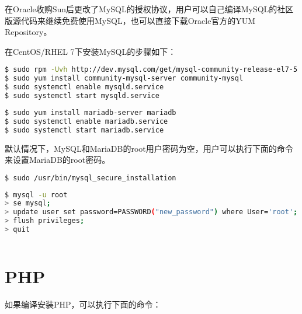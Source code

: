 在Oracle收购Sun后更改了MySQL的授权协议，用户可以自己编译MySQL的社区版源代码来继续免费使用MySQL，也可以直接下载Oracle官方的YUM Repository。


在CentOS/RHEL 7下安装MySQL的步骤如下：

\begin{lstlisting}[language=bash]
$ sudo rpm -Uvh http://dev.mysql.com/get/mysql-community-release-el7-5.noarch.rpm
$ sudo yum install community-mysql-server community-mysql
$ sudo systemctl enable mysqld.service
$ sudo systemctl start mysqld.service
\end{lstlisting}




\begin{lstlisting}[language=bash]
$ sudo yum install mariadb-server mariadb
$ sudo systemctl enable mariadb.service
$ sudo systemctl start mariadb.service
\end{lstlisting}


默认情况下，MySQL和MariaDB的root用户密码为空，用户可以执行下面的命令来设置MariaDB的root密码。

\begin{lstlisting}[language=bash]
$ sudo /usr/bin/mysql_secure_installation
\end{lstlisting}


\begin{lstlisting}[language=bash]
$ mysql -u root
> se mysql;
> update user set password=PASSWORD("new_password") where User='root';
> flush privileges;
> quit
\end{lstlisting}




\begin{lstlisting}[language=bash]

\end{lstlisting}

\section{PHP}

如果编译安装PHP，可以执行下面的命令：

